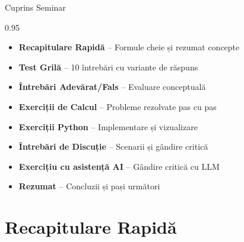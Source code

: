 \documentclass[9pt, aspectratio=169, t]{beamer}
\subtitle{Seminar 5: Selecția Modelului și Backtesting}
\begin{document}
{
\begin{frame}
    \titlepage
\end{frame}
}


\begin{frame}{Cuprins Seminar}
    \begin{cminipage}{0.95\textwidth}
    \begin{itemize}\setlength{\itemsep}{0pt}
        \item \textbf{Recapitulare Rapidă} -- Formule cheie și rezumat concepte
        \vspace{0.15cm}
        \item \textbf{Test Grilă} -- 10 întrebări cu variante de răspuns
        \vspace{0.15cm}
        \item \textbf{Întrebări Adevărat/Fals} -- Evaluare conceptuală
        \vspace{0.15cm}
        \item \textbf{Exerciții de Calcul} -- Probleme rezolvate pas cu pas
        \vspace{0.15cm}
        \item \textbf{Exerciții Python} -- Implementare și vizualizare
        \vspace{0.15cm}
        \item \textbf{Întrebări de Discuție} -- Scenarii și gândire critică
        \vspace{0.15cm}
        \item \textbf{Exercițiu cu asistență AI} -- Gândire critică cu LLM
        \vspace{0.15cm}
        \item \textbf{Rezumat} -- Concluzii și pași următori
    \end{itemize}
    \end{cminipage}
\end{frame}

\section{Recapitulare Rapidă}
\end{document}
